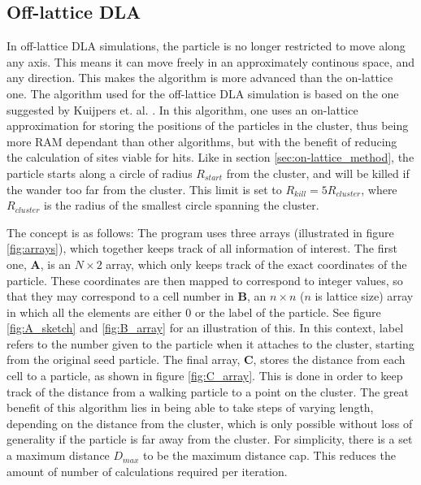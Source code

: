 \subsection{Off-lattice DLA}
In off-lattice DLA simulations, the particle is no longer restricted to move along any axis. This means it can move freely in an approximately continous space, and any direction. This makes the algorithm is more advanced than the on-lattice one. The algorithm used for the off-lattice DLA simulation is based on the one suggested by Kuijpers et. al. \cite{Kuijpers2014841}. In this algorithm, one uses an on-lattice approximation for storing the positions of the particles in the cluster, thus being more RAM dependant than other algorithms, but with the benefit of reducing the calculation of sites viable for hits. Like in section \ref{sec:on-lattice_method}, the particle starts along a circle of radius $R_{start}$ from the cluster, and will be killed if the wander too far from the cluster. This limit is set to $R_{kill} = 5R_{cluster}$, where $R_{cluster}$ is the radius of the smallest circle spanning the cluster.

The concept is as follows: The program uses three arrays (illustrated in figure \ref{fig:arrays}), which together keeps track of all information of interest. The first one, $\textbf{A}$, is an $N \times 2$ array, which only keeps track of the exact coordinates of the particle. These coordinates are then mapped to correspond to integer values, so that they may correspond to a cell number in $\textbf{B}$, an $n \times n$ ($n$ is lattice size) array in which all the elements are either $0$ or the label of the particle. See figure \ref{fig:A_sketch} and \ref{fig:B_array} for an illustration of this. In this context, label refers to the number given to the particle when it attaches to the cluster, starting from the original seed particle. The final array, $\textbf{C}$, stores the distance from each cell to a particle, as shown in figure \ref{fig:C_array}. This is done in order to keep track of the distance from a walking particle to a point on the cluster. The great benefit of this algorithm lies in being able to take steps of varying length, depending on the distance from the cluster, which is only possible without loss of generality if the particle is far away from the cluster. For simplicity, there is a set a maximum distance $D_{max}$ to be the maximum distance cap. This reduces the amount of number of calculations required per iteration. 

